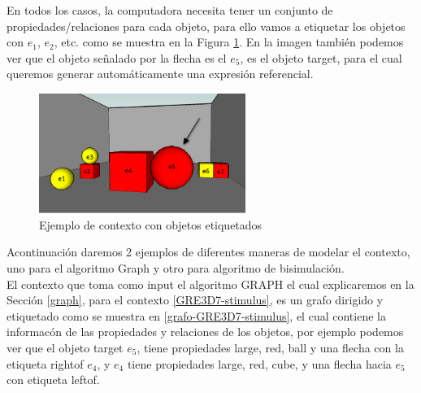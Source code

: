 En todos los casos, la computadora necesita tener un conjunto de propiedades/relaciones para cada objeto, para ello vamos a etiquetar los objetos con $e_1$, $e_2$, etc. como se muestra en la Figura \ref{GRE3D7-stimulus-conLetras}. En la imagen tambi\'en podemos ver que el objeto se\~nalado por la flecha es el $e_5$, es el objeto target, para el cual queremos generar autom\'aticamente una expresi\'on referencial.

\begin{figure}[ht]
\centering
\includegraphics[width=0.6\textwidth]{images/22.jpg}
\caption{Ejemplo de contexto con objetos etiquetados}
\label{GRE3D7-stimulus-conLetras}
\end{figure}

Acontinuaci\'on daremos 2 ejemplos de diferentes maneras de modelar el contexto, uno para el algoritmo Graph y otro para algoritmo de bisimulaci\'on.\\

El contexto que toma como input el algoritmo GRAPH \cite{graph08} el cual explicaremos en la Secci\'on \ref{graph}, para el contexto \ref{GRE3D7-stimulus}, es un grafo dirigido y etiquetado como se muestra en \ref{grafo-GRE3D7-stimulus}, el cual contiene la informac\'on de las propiedades y relaciones de los objetos, por ejemplo podemos ver que el objeto target $e_5$, tiene propiedades large, red, ball y una flecha con la etiqueta rightof $e_4$, y $e_4$ tiene propiedades large, red, cube, y una flecha hacia $e_5$ con etiqueta leftof.\\

